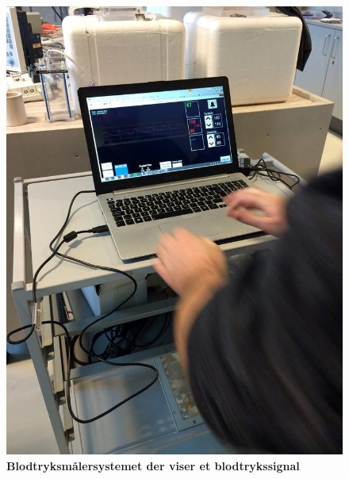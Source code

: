 \begin{figure}[htb]
  \begin{minipage}{0.45\textwidth}
    \centering
      \includegraphics[width=\textwidth]{billeder/integrationstest_opstilling}
      \caption{\textbf{Blodtryksmålersystemet der viser et blodtrykssignal}}
    \label{fig:figur1}
  \end{minipage}
  \hspace{0.1\textwidth}
  \begin{minipage}{0.45\textwidth}
    \centering

\end{minipage}
\end{figure}
